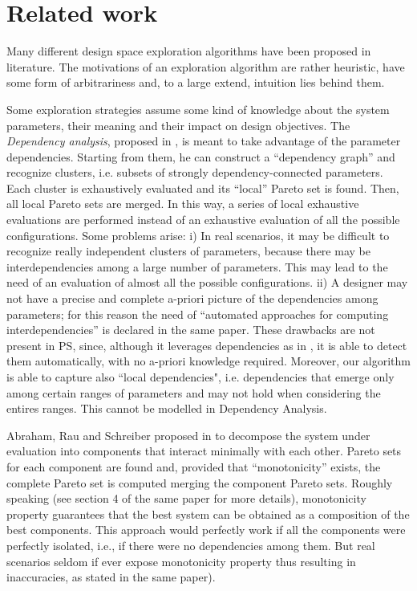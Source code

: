 \section{Related work}
Many different design space exploration algorithms have been proposed
in literature.  The motivations of an exploration
algorithm are rather heuristic, have some form of arbitrariness and,
to a large extend, intuition lies behind them.

Some exploration strategies assume some kind of knowledge about the
system parameters, their meaning and their impact on design
objectives.  The \emph{Dependency analysis}, proposed in
\cite{givargis_tvlsi02}, is meant to take advantage of the parameter
dependencies. Starting from them, he can construct a ``dependency graph''
and recognize clusters, i.e. subsets of strongly dependency-connected
parameters. Each cluster is exhaustively evaluated and its ``local''
Pareto set is found. Then, all local Pareto sets are merged. In this
way, a series of local exhaustive evaluations are performed instead of
an exhaustive evaluation of all the possible configurations. Some
problems arise: i) In real scenarios, it may be difficult to recognize
really independent clusters of parameters, because there may be
interdependencies among a large number of parameters. This may lead to
the need of an evaluation of almost all the possible configurations.
ii) A designer may not have a precise and complete a-priori picture of
the dependencies among parameters; for this reason the need of
``automated approaches for computing interdependencies'' is declared
in the same paper.  These drawbacks are not present in PS,
since, although it leverages dependencies as in
\cite{givargis_tvlsi02}, it is able to detect them automatically, with
no a-priori knowledge required. Moreover, our algorithm is able to
capture also ``local dependencies", i.e. dependencies that emerge only
among certain ranges of parameters and may not hold when considering
the entires ranges. This cannot be modelled in Dependency Analysis. 

Abraham, Rau and Schreiber proposed in \cite{santosh_hptr00} to decompose
the system under evaluation into components that interact minimally
with each other. Pareto sets for each component are found and, provided
that ``monotonicity'' exists, the complete Pareto set is computed
merging the component Pareto sets. Roughly speaking (see section 4
of the same paper for more details), monotonicity property guarantees
that the best system can be obtained as a composition of the best
components. This approach would perfectly work if all the components
were perfectly isolated, i.e., if there were no dependencies among
them. But real scenarios seldom if ever
expose monotonicity property thus resulting in inaccuracies, as stated in the same paper).

